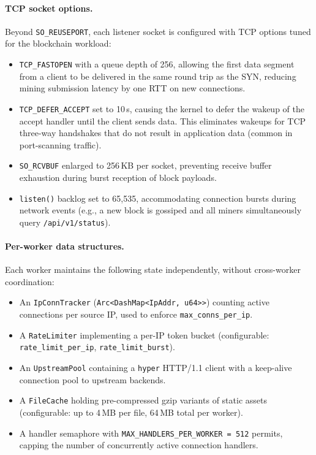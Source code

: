 \documentclass[a4paper, 11pt]{article}
\begin{document}
\paragraph{TCP socket options.}  Beyond \texttt{SO\_REUSEPORT}, each listener
socket is configured with TCP options tuned for the blockchain workload:
\begin{itemize}
  \item \texttt{TCP\_FASTOPEN} with a queue depth of 256, allowing the first
        data segment from a client to be delivered in the same round trip as the
        SYN, reducing mining submission latency by one RTT on new connections.
  \item \texttt{TCP\_DEFER\_ACCEPT} set to 10\,s, causing the kernel to defer
        the wakeup of the accept handler until the client sends data.  This
        eliminates wakeups for TCP three-way handshakes that do not result in
        application data (common in port-scanning traffic).
  \item \texttt{SO\_RCVBUF} enlarged to 256\,KB per socket, preventing receive
        buffer exhaustion during burst reception of block payloads.
  \item \texttt{listen()} backlog set to 65{,}535, accommodating connection
        bursts during network events (e.g., a new block is gossiped and all
        miners simultaneously query \texttt{/api/v1/status}).
\end{itemize}

\paragraph{Per-worker data structures.}  Each worker maintains the following
state independently, without cross-worker coordination:
\begin{itemize}
  \item An \texttt{IpConnTracker} (\texttt{Arc<DashMap<IpAddr, u64>>}) counting
        active connections per source IP, used to enforce \texttt{max\_conns\_per\_ip}.
  \item A \texttt{RateLimiter} implementing a per-IP token bucket
        (configurable: \texttt{rate\_limit\_per\_ip}, \texttt{rate\_limit\_burst}).
  \item An \texttt{UpstreamPool} containing a \texttt{hyper} HTTP/1.1 client
        with a keep-alive connection pool to upstream backends.
  \item A \texttt{FileCache} holding pre-compressed gzip variants of static
        assets (configurable: up to 4\,MB per file, 64\,MB total per worker).
  \item A handler semaphore with \texttt{MAX\_HANDLERS\_PER\_WORKER = 512}
        permits, capping the number of concurrently active connection handlers.
\end{itemize}
\end{document}
